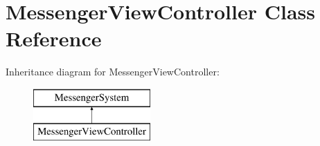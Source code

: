 \hypertarget{interface_messenger_view_controller}{
\section{MessengerViewController Class Reference}
\label{interface_messenger_view_controller}
}
Inheritance diagram for MessengerViewController:\begin{figure}[H]
\begin{center}
\leavevmode
\includegraphics[height=2.000000cm]{interface_messenger_view_controller}
\end{center}
\end{figure}
